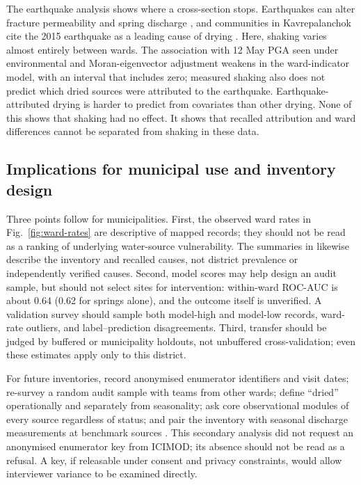 \documentclass[preprint,12pt,authoryear]{elsarticle}
\newcommand{\auc}{ROC-AUC}
\begin{document}
The earthquake analysis shows where a cross-section stops. Earthquakes can alter fracture permeability and spring discharge \citep{wang2010earthquakes}, and communities in Kavrepalanchok cite the 2015 earthquake as a leading cause of drying \citep{pandit2026community}. Here, shaking varies almost entirely between wards. The association with 12 May PGA seen under environmental and Moran-eigenvector adjustment weakens in the ward-indicator model, with an interval that includes zero; measured shaking also does not predict which dried sources were attributed to the earthquake. Earthquake-attributed drying is harder to predict from covariates than other drying. None of this shows that shaking had no effect. It shows that recalled attribution and ward differences cannot be separated from shaking in these data.

\subsection{Implications for municipal use and inventory design}
Three points follow for municipalities. First, the observed ward rates in Fig.~\ref{fig:ward-rates} are descriptive of mapped records; they should not be read as a ranking of underlying water-source vulnerability. The summaries in \citet{pandit2026community} likewise describe the inventory and recalled causes, not district prevalence or independently verified causes. Second, model scores may help design an audit sample, but should not select sites for intervention: within-ward \auc{} is about 0.64 (0.62 for springs alone), and the outcome itself is unverified. A validation survey should sample both model-high and model-low records, ward-rate outliers, and label--prediction disagreements. Third, transfer should be judged by buffered or municipality holdouts, not unbuffered cross-validation; even these estimates apply only to this district.

For future inventories, record anonymised enumerator identifiers and visit dates; re-survey a random audit sample with teams from other wards; define ``dried'' operationally and separately from seasonality; ask core observational modules of every source regardless of status; and pair the inventory with seasonal discharge measurements at benchmark sources \citep{buytaert2014citizen, kosmala2016assessing, thapa2025citizen}. This secondary analysis did not request an anonymised enumerator key from ICIMOD; its absence should not be read as a refusal. A key, if releasable under consent and privacy constraints, would allow interviewer variance to be examined directly.
\end{document}
